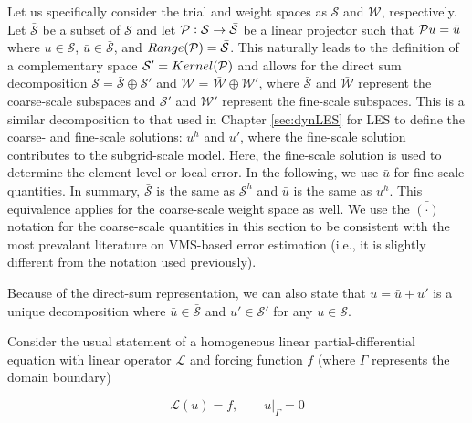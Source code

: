 Let us specifically consider the trial and weight spaces as $\mathcal{S}$ and $\mathcal{W}$, respectively.
Let $\bar{\mathcal{S}}$ be a subset of $\mathcal{S}$ and let $\mathcal{P}: \mathcal{S} \rightarrow \bar{\mathcal{S}}$ be a linear projector such that $\mathcal{P} u = \bar{u}$ where $u \in \mathcal{S}$, $\bar{u} \in \bar{\mathcal{S}}$, and $Range(\mathcal{P})=\bar{\mathcal{S}}$.
This naturally leads to the definition of a complementary space $\mathcal{S}' = Kernel(\mathcal{P})$ and allows for the direct sum decomposition $\mathcal{S} = \bar{\mathcal{S}} \oplus \mathcal{S}'$ and $\mathcal{W}$ = $\bar{\mathcal{W}} \oplus \mathcal{W}'$, where $\bar{\mathcal{S}}$ and $\bar{\mathcal{W}}$ represent the coarse-scale subspaces and $\mathcal{S}'$ and $\mathcal{W}'$ represent the fine-scale subspaces. This is a similar decomposition to that used in Chapter \ref{sec:dynLES} for LES to define the coarse- and fine-scale solutions: $u^h$ and $u'$, where the fine-scale solution contributes to the subgrid-scale model.
Here, the fine-scale solution is used to determine the element-level or local error. In the following, we use $\bar{u}$ for fine-scale quantities. In summary, $\bar{\mathcal{S}}$ is the same as $\mathcal{S}^h$ and $\bar{u}$ is the same as $u^h$. This equivalence applies for the coarse-scale weight space as well. 
We use the $\bar{(\cdot)}$ notation for the coarse-scale quantities in this section to be consistent with the most prevalant literature on VMS-based error estimation (i.e., it is slightly different from the notation used previously).

Because of the direct-sum representation, we can also state that $u=\bar{u}+u'$ is a unique decomposition where $\bar{u} \in \bar{\mathcal{S}}$ and $u' \in \mathcal{S}'$ for any $u \in \mathcal{S}$.


Consider the usual statement of a homogeneous linear partial-differential equation with linear operator $\mathcal{L}$ and forcing function $f$ (where $\Gamma$ represents the domain boundary)

\begin{equation}
    \mathcal{L}(u) = f, \qquad u|_{\Gamma} = 0
    \label{eq:modelProblem}
\end{equation} 


